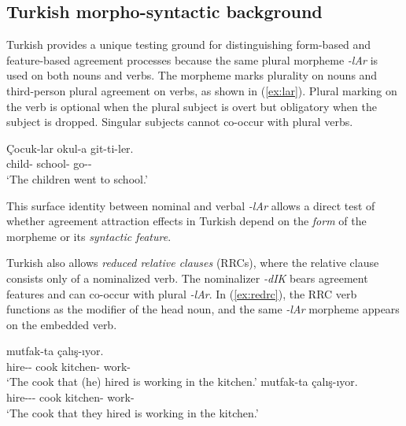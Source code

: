 \documentclass[
  authoryear,
  preprint]{elsarticle}
\begin{document}
\subsection{Turkish morpho-syntactic
background}\label{turkish-morpho-syntactic-background}

Turkish provides a unique testing ground for distinguishing form-based
and feature-based agreement processes because the same plural morpheme
\emph{-lAr} is used on both nouns and verbs. The morpheme marks
plurality on nouns and third-person plural agreement on verbs, as shown
in (\ref{ex:lar}). Plural marking on the verb is optional when the
plural subject is overt but obligatory when the subject is dropped.
Singular subjects cannot co-occur with plural verbs.

\begin{exe}
\ex \label{ex:lar}
\begin{xlist}
\ex
\gll Çocuk-lar okul-a git-ti-ler.\\
child-\Pl{} school-\Dat{} go-\Pst{}-\Pl{}\\
\glt `The children went to school.'
\end{xlist}
\end{exe}

This surface identity between nominal and verbal \emph{-lAr} allows a
direct test of whether agreement attraction effects in Turkish depend on
the \emph{form} of the morpheme or its \emph{syntactic feature}.

Turkish also allows \emph{reduced relative clauses} (RRCs), where the
relative clause consists only of a nominalized verb. The nominalizer
\emph{-dIK} bears agreement features and can co-occur with plural
\emph{-lAr}. In (\ref{ex:redrc}), the RRC verb functions as the modifier
of the head noun, and the same \emph{-lAr} morpheme appears on the
embedded verb.

\begin{exe}
\ex \label{ex:redrc}
\begin{xlist}
\ex
{} mutfak-ta çalış-ıyor.\\
hire-\Nmlz{}-\Poss{} cook kitchen-\Loc{} work-\Prog{}\\
\glt `The cook that (he) hired is working in the kitchen.'
\ex
{} mutfak-ta çalış-ıyor.\\
hire-\Nmlz{}-\Pl{}-\Poss{} cook kitchen-\Loc{} work-\Prog{}\\
\glt `The cook that they hired is working in the kitchen.'
\end{xlist}
\end{exe}
\end{document}
